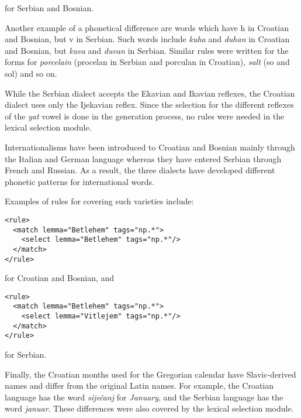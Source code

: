 for Serbian and Bosnian.

Another example of a phonetical difference are words which have h in Croatian and Bosnian, but v in Serbian.
Such words include \emph{kuha} and \emph{duhan} in Croatian and Bosnian, but \emph{kuva} and \emph{duvan} in Serbian.
Similar rules were written for the forms for \emph{porcelain} (procelan in Serbian and porculan in Croatian), 
\emph{salt} (so and sol) and so on.

While the Serbian dialect accepts the Ekavian and Ikavian reflexes, 
the Croatian dialect uses only the Ijekavian reflex.
Since the selection for the different reflexes of the \emph{yat} vowel is done in the generation process,
no rules were needed in the lexical selection module.

Internationalisms have been introduced to Croatian and Bosnian mainly through the Italian and German language
whereas they have entered Serbian through French and Russian. 
As a result, the three dialects have developed different phonetic patterns for international words.

Examples of rules for covering such varieties include:
{\small
\begin{Verbatim}
<rule>
  <match lemma="Betlehem" tags="np.*">
    <select lemma="Betlehem" tags="np.*"/>
  </match>
</rule>
\end{Verbatim}
}
for Croatian and Bosnian, and
{\small
\begin{Verbatim}
<rule>
  <match lemma="Betlehem" tags="np.*">
    <select lemma="Vitlejem" tags="np.*"/>
  </match>
</rule>
\end{Verbatim}
}
for Serbian.

Finally, the Croatian months used for the Gregorian calendar have Slavic-derived names and differ from the original Latin names.
For example, the Croatian language has the word \emph{siječanj} for \emph{January}, and 
the Serbian language has the word \emph{januar}.
These differences were also covered by the lexical selection module.


